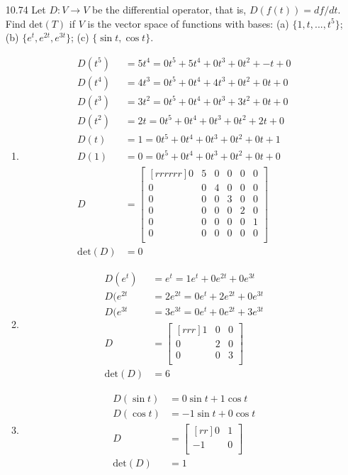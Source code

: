 \documentclass[12pt]{article}
\theoremstyle{definition}
\theoremstyle{plain}
\begin{document}
\begin{enumerate}
\item[10.74]Let $D: V\rightarrow V$ be the differential operator, that is, $D(f(t))=df/dt$. Find $\mathrm{det}(T)$ if $V$ is the vector space of functions with bases: (a) $\{1,t,...,t^5\}$; (b) $\{e^t,e^{2t},e^{3t}\}$; (c) $\{\sin t, \cos t\}$.
	\begin{enumerate}
	\item
	\begin{align*}
	D(t^5)&=5t^4=0t^5+5t^4+0t^3+0t^2+-t+0\\
	D(t^4)&=4t^3=0t^5+0t^4+4t^3+0t^2+0t+0\\
	D(t^3)&=3t^2=0t^5+0t^4+0t^3+3t^2+0t+0\\
	D(t^2)&=2t  =0t^5+0t^4+0t^3+0t^2+2t+0\\
	D(t)  &=1   =0t^5+0t^4+0t^3+0t^2+0t+1\\
	D(1)  &=0   =0t^5+0t^4+0t^3+0t^2+0t+0\\
	D&= \begin{bmatrix}[rrrrrr]0&5&0&0&0&0\\0&0&4&0&0&0\\0&0&0&3&0&0\\0&0&0&0&2&0\\0&0&0&0&0&1\\0&0&0&0&0&0\\\end{bmatrix}\\
	\mathrm{det}(D) &= 0
	\end{align*}
	
	\item
	\begin{align*}
	D(e^t)&=e^t=1e^t+0e^{2t}+0e^{3t}\\
	D(e^{2t}&=2e^{2t}=0e^t+2e^{2t}+0e^{3t}\\
	D(e^{3t}&=3e^{3t}=0e^t+0e^{2t}+3e^{3t}\\
	D&=\begin{bmatrix}[rrr]1&0&0\\0&2&0\\0&0&3\\\end{bmatrix}\\
	\mathrm{det}(D)&=6
	\end{align*}
	\item
	\begin{align*}
	D(\sin t) &= 0\sin t + 1\cos t\\
	D(\cos t) &= -1\sin t + 0\cos t\\
	D&=\begin{bmatrix}[rr]0&1\\-1&0\\\end{bmatrix}\\
	\mathrm{det}(D)&= 1
	\end{align*}
	\end{enumerate}
	

\end{enumerate}
\end{document}
